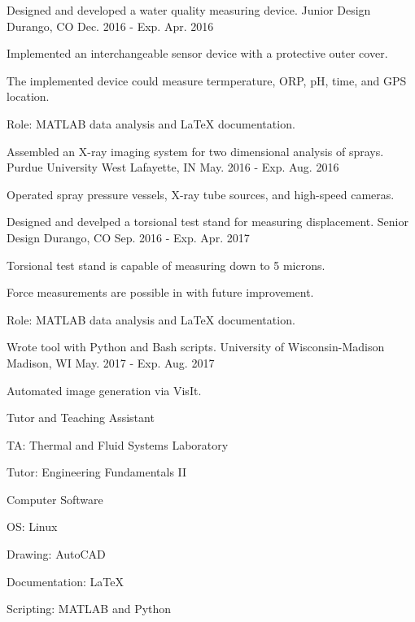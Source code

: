 \begin{cventries}
  \cventry
    {Designed and developed a water quality measuring device.}
    {Junior Design}
    {Durango, CO}
    {Dec. 2016 - Exp. Apr. 2016}
    {
      \begin{cvitems}
        \item {Implemented an interchangeable sensor device with a protective outer cover.}
        \item {The implemented device could measure termperature, ORP, pH, time, and GPS location.}
        \item {Role: MATLAB data analysis and LaTeX documentation.}
      \end{cvitems}
    }
    
  \cventry
    {Assembled an X-ray imaging system for two dimensional analysis of sprays.}
    {Purdue University}
    {West Lafayette, IN}
    {May. 2016 - Exp. Aug. 2016}
    {
      \begin{cvitems}
        \item {Operated spray pressure vessels, X-ray tube sources, and high-speed cameras.}
      \end{cvitems}
    }
    
  \cventry
    {Designed and develped a torsional test stand for measuring displacement.}
    {Senior Design}
    {Durango, CO}
    {Sep. 2016 - Exp. Apr. 2017}
    {
      \begin{cvitems}
        \item {Torsional test stand is capable of measuring down to 5 microns.}
        \item {Force measurements are possible in with future improvement.}
        \item {Role: MATLAB data analysis and LaTeX documentation.}
      \end{cvitems}
    }
    
  \cventry
    {Wrote tool with Python and Bash scripts.}
    {University of Wisconsin-Madison}
    {Madison, WI}
    {May. 2017 - Exp. Aug. 2017}
    {
      \begin{cvitems}
        \item {Automated image generation via VisIt.}
      \end{cvitems}
    }

  \cventry
    {}
    {Tutor and Teaching Assistant}
    {}
    {}
    {
      \begin{cvitems}
        \item {TA: Thermal and Fluid Systems Laboratory}
        \item {Tutor: Engineering Fundamentals II}
      \end{cvitems}
    }
  \cventry
    {}
    {Computer Software}
    {}
    {}
    {
      \begin{cvitems}
        \item {OS: Linux}
        \item {Drawing: AutoCAD}
        \item {Documentation: LaTeX}
        \item {Scripting: MATLAB and Python}
      \end{cvitems}
    }

\end{cventries}
